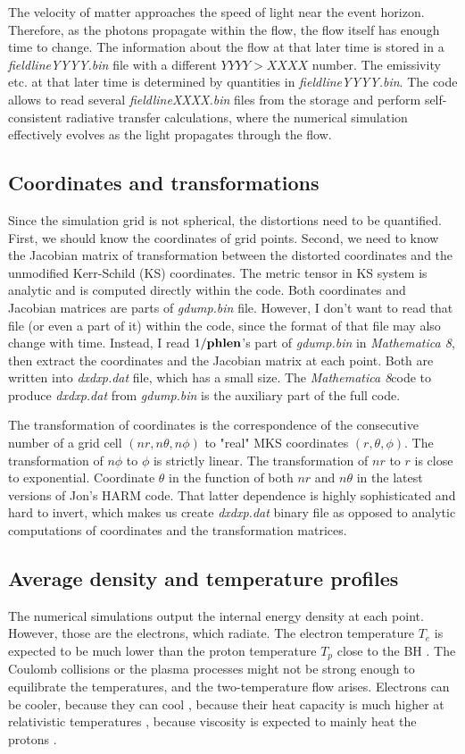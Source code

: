 \documentclass{emulateapj}
\newcommand{\mat}{\textit{Mathematica 8}}
\begin{document}
The velocity of matter approaches the speed of light near the event horizon. Therefore, as the photons propagate within the flow, the flow itself has enough time to change.
The information about the flow at that later time is stored in a \textit{fieldlineYYYY.bin} file with a different $YYYY>XXXX$ number. The emissivity etc.
at that later time is determined by quantities in \textit{fieldlineYYYY.bin}. The code allows to read several \textit{fieldlineXXXX.bin} files from the storage
and perform self-consistent radiative transfer calculations, where the numerical simulation effectively evolves as the light propagates through the flow.

\subsection{Coordinates and transformations}
Since the simulation grid is not spherical, the distortions need to be quantified.
First, we should know the coordinates of grid points. Second, we need to know the Jacobian matrix of transformation between the distorted coordinates and
the unmodified Kerr-Schild (KS) coordinates. The metric tensor in KS system is analytic and is computed directly within the code.
Both coordinates and Jacobian matrices are parts of \textit{gdump.bin} file. However, I don't want to read that file (or even a part of it) within the code,
since the format of that file may also change with time. Instead, I read $1/{\bf phlen}$'s part of \textit{gdump.bin} in \mat, then extract the coordinates and the Jacobian matrix at each point.
Both are written into \textit{dxdxp.dat} file, which has a small size.
The \mat code to produce \textit{dxdxp.dat} from \textit{gdump.bin} is the auxiliary part of the full code.

The transformation of coordinates is the correspondence of the consecutive number of a grid cell $(nr,n\theta,n\phi)$ to "real" MKS coordinates $(r,\theta,\phi)$.
The transformation of $n\phi$ to $\phi$ is strictly linear. The transformation of $nr$ to $r$ is close to exponential.
Coordinate $\theta$ in the function of both $nr$ and $n\theta$ in the latest versions of Jon's HARM code.
That latter dependence is highly sophisticated and hard to invert, which makes us create \textit{dxdxp.dat} binary file as opposed to analytic computations of coordinates
and the transformation matrices.

\subsection{Average density and temperature profiles}
The numerical simulations output the internal energy density at each point. However, those are the electrons, which radiate.
The electron temperature $T_e$ is expected to be much lower than the proton temperature $T_p$ close to the BH \citep{Narayan:1995kj}.
The Coulomb collisions or the plasma processes might not be strong enough to equilibrate the temperatures, and the two-temperature flow arises.
Electrons can be cooler, because they can cool \citep{Drappeau:2012dq}, because their heat capacity is much higher at relativistic temperatures \citep{Shcherbakov:2010cond},
because viscosity is expected to mainly heat the protons \citep{Narayan:1995kj,Sharma_heating:2007}.
\end{document}
